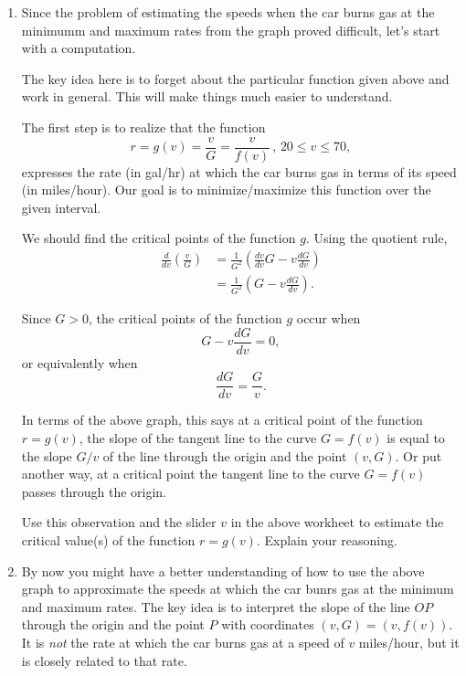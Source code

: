 \documentclass{ximera}
\begin{document}
\begin{question}
\begin{explanation}
\begin{enumerate}
\item Since the problem of estimating the speeds when the car burns gas at the minimumm and maximum rates from the graph proved difficult, let's start with a computation.

The key idea here is to forget about the particular function given above and work in general. This will make things much easier to understand.

The first step is to realize that the function
\[
  r =g(v) = \frac{v}{G} = \frac{v}{f(v)} \, , \, 20\leq v \leq 70,
\]
expresses the rate (in gal/hr) at which the car burns gas in terms of its speed (in miles/hour). Our goal is to minimize/maximize this function over the given interval.

We should find the critical points of the function $g$. Using the quotient rule,
\begin{align*}
   \frac{d}{dv} \left( \frac{v}{G} \right) &= \frac{1}{G^2} \left( \frac{dv}{dv} G - v\frac{dG}{dv}  \right) \\
                                                         &= \frac{1}{G^2} \left( G - v\frac{dG}{dv}  \right) .
\end{align*}

Since $G>0$, the critical points of the function $g$ occur when
\[
  G - v\frac{dG}{dv} = 0 ,
\]
or equivalently when
\[
      \frac{dG}{dv} = \frac{G}{v} .
\]

In terms of the above graph, this says at a critical point of the function $r=g(v)$, the slope of the tangent line to the curve $G=f(v)$ is equal to the slope $G/v$ of the line through the origin and the point $(v,G)$. Or put another way, at a critical point the tangent line to the curve $G=f(v)$ passes through the origin.

Use this observation and the slider $v$ in the above workheet to estimate the critical value(s) of the function $r=g(v)$. Explain your reasoning.

\begin{freeResponse}
\end{freeResponse}

\item By now you might have a better understanding of how to use the above graph to approximate the speeds at which the car bunrs gas at the minimum and maximum rates. The key idea is to interpret the slope of the line $OP$ through the origin and the point $P$ with coordinates $(v,G) = (v,f(v))$. It is \emph{not} the rate at which the car burns gas at a speed of $v$ miles/hour, but it is closely related to that rate.


\end{enumerate}
\end{explanation}
\end{question}
\end{document}
